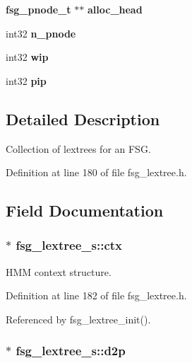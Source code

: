 \begin{DoxyCompactItemize}
\item 
{\bf fsg\-\_\-pnode\-\_\-t} $\ast$$\ast$ {\bfseries alloc\-\_\-head}\label{structfsg__lextree__s_a430605e77e2ad3de2b5e2aa1fb7eb365}

\item 
int32 {\bfseries n\-\_\-pnode}\label{structfsg__lextree__s_ac55755e9f9453acab71a23a5cf3ea542}

\item 
int32 {\bfseries wip}\label{structfsg__lextree__s_a791fcaf2440b7d90796c5e7e50a7b186}

\item 
int32 {\bfseries pip}\label{structfsg__lextree__s_a9e6768eff7003453759b1ade9cb50bc7}

\end{DoxyCompactItemize}


\subsection{Detailed Description}
Collection of lextrees for an F\-S\-G. 

Definition at line 180 of file fsg\-\_\-lextree.\-h.



\subsection{Field Documentation}
\subsubsection[{ctx}]{$\ast$ fsg\-\_\-lextree\-\_\-s\-::ctx}\label{structfsg__lextree__s_afbbd5d59a74dfb287289aa20a9a3979a}


H\-M\-M context structure. 



Definition at line 182 of file fsg\-\_\-lextree.\-h.



Referenced by fsg\-\_\-lextree\-\_\-init().

\subsubsection[{d2p}]{$\ast$ fsg\-\_\-lextree\-\_\-s\-::d2p}\label{structfsg__lextree__s_add12fb7151ebdecb74deaf6aca86d95e}


